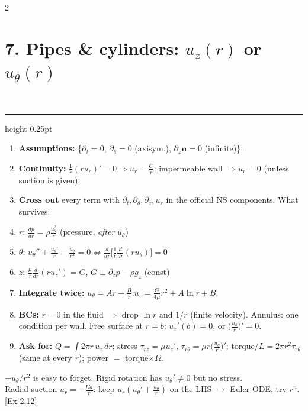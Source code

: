 \documentclass[8pt]{extarticle}
\newcommand{\sub}[1]{\par\vspace{3pt}{\color{hd}\bfseries #1}\ {\color{rl}\leaders\hrule height 0.25pt\hfill\kern0pt}\par\vspace{0.8pt}}
\newcommand{\nl}{\\[1.6pt]}
\newcommand{\bu}{\mathbf u}
\newcommand{\pd}{\partial}
\newcommand{\wn}[1]{{\color{wn}#1}}
\newcommand{\ex}[1]{{\color{ex}\scriptsize[#1]}}
\newcommand{\as}[1]{{\color{gray}\{#1\}}}
\begin{document}
\begin{multicols*}{2}
\section{7. Pipes \& cylinders: $u_z(r)$ or $u_\theta(r)$}
\sub{Steps}
\begin{enumerate}
\item \textbf{Assumptions:} \as{$\pd_t=0$, $\pd_\theta=0$ (axisym.), $\pd_z\bu=0$ (infinite)}.
\item \textbf{Continuity:} $\frac1r(ru_r)'=0\Rightarrow u_r=\frac Cr$; impermeable wall $\Rightarrow u_r=0$ (unless suction is given).
\item \textbf{Cross out} every term with $\pd_t,\pd_\theta,\pd_z,u_r$ in the official NS components. What survives:
\item[] $r$: $\frac{dp}{dr}=\rho\frac{u_\theta^2}r$ (pressure, \emph{after} $u_\theta$)
\item[] $\theta$: $u_\theta''+\frac{u_\theta'}r-\frac{u_\theta}{r^2}=0\iff\frac{d}{dr}\big[\frac1r\frac{d}{dr}(ru_\theta)\big]=0$
\item[] $z$: $\frac\mu r\frac{d}{dr}(ru_z')=G$, $G\equiv\pd_zp-\rho g_z$ (const)
\item \textbf{Integrate twice:} $u_\theta=Ar+\frac Br$;\quad $u_z=\frac G{4\mu}r^2+A\ln r+B$.
\item \textbf{BCs:} \wn{$r=0$ in the fluid $\Rightarrow$ drop $\ln r$ and $1/r$} (finite velocity). Annulus: one condition per wall. Free surface at $r=b$: $u_z'(b)=0$, or $\big(\frac{u_\theta}{r}\big)'=0$.
\item \textbf{Ask for:} $Q=\int2\pi r\,u_z\,dr$; stress $\tau_{rz}=\mu u_z'$, $\tau_{r\theta}=\mu r\big(\frac{u_\theta}r\big)'$; torque$/L=2\pi r^2\tau_{r\theta}$ (same at every $r$); power $=$ torque$\times\Omega$.
\end{enumerate}
\wn{$-u_\theta/r^2$ is easy to forget. Rigid rotation has $u_\theta'\neq0$ but no stress.}\nl
Radial suction $u_r=-\frac{Ua}r$: keep $u_r(u_\theta'+\frac{u_\theta}r)$ on the LHS $\to$ Euler ODE, try $r^n$. \ex{Ex 2.12}


\end{multicols*}
\end{document}
